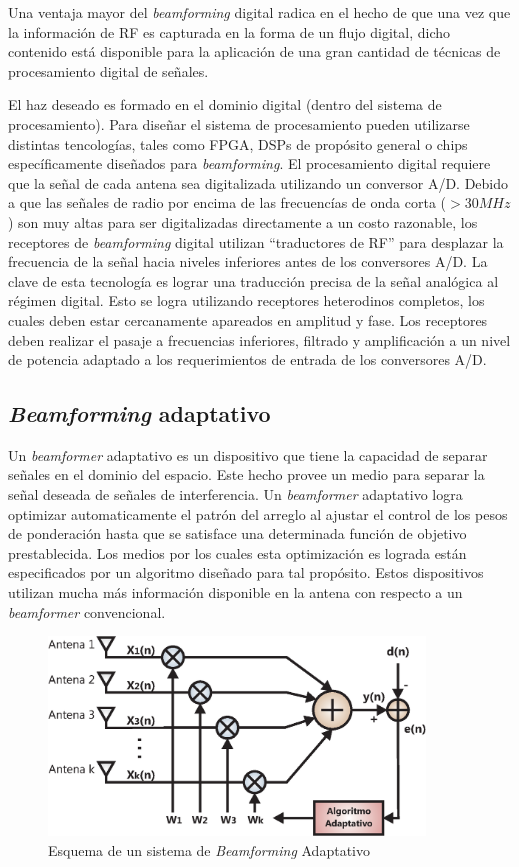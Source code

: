 Una ventaja mayor del \textit{beamforming} digital radica en el hecho de que una vez que la información de RF es capturada en la forma de un flujo digital, dicho contenido está disponible para la aplicación de una gran cantidad de técnicas de procesamiento digital de señales. 

El haz deseado es formado en el dominio digital (dentro del sistema de procesamiento). Para diseñar el sistema de procesamiento pueden utilizarse distintas tencologías, tales como FPGA, DSPs de propósito general o chips específicamente diseñados para \textit{beamforming}. El procesamiento digital requiere que la señal de cada antena sea digitalizada utilizando un conversor A/D. Debido a que las señales de radio por encima de las frecuencías de onda corta ($>30 MHz$) son muy altas para ser digitalizadas directamente a un costo razonable, los receptores de \textit{beamforming} digital utilizan ``traductores de RF'' para desplazar la frecuencia de la señal hacia niveles inferiores antes de los conversores A/D. La clave de esta tecnología es lograr una traducción precisa de la señal analógica al régimen digital. Esto se logra utilizando receptores heterodinos completos, los cuales deben estar cercanamente apareados en amplitud y fase. Los receptores deben realizar el pasaje a frecuencias inferiores, filtrado y amplificación a un nivel de potencia adaptado a los requerimientos de entrada de los conversores A/D.


\subsection{\textit{Beamforming} adaptativo}

Un \textit{beamformer} adaptativo es un dispositivo que tiene la capacidad de separar señales en el dominio del espacio. Este hecho provee un medio para separar la señal deseada de señales de interferencia. Un \textit{beamformer} adaptativo logra optimizar automaticamente el patrón del arreglo al ajustar el control de los pesos de ponderación hasta que se satisface una determinada función de objetivo prestablecida. Los medios por los cuales esta optimización es lograda están especificados por un algoritmo diseñado para tal propósito. Estos dispositivos utilizan mucha más información disponible en la antena con respecto a un \textit{beamformer} convencional.

\begin{figure}[htb!]
        \centering
        \includegraphics[width=10cm]{./figures/C02-adaptive_beamforming}
        \caption{Esquema de un sistema de \textit{Beamforming} Adaptativo}
        \label{fig:Adaptive_Beamforming}
\end{figure}

